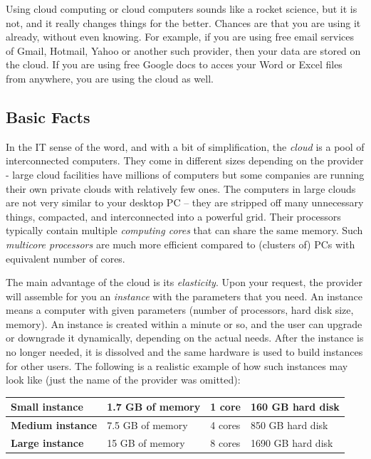 \documentclass{article}
\begin{document}
Using cloud computing or cloud computers sounds like a rocket science, but it is not,
and it really changes things for the better. Chances are that you are using 
it already, without even knowing. For example, if you are using free email services of Gmail, 
Hotmail, Yahoo or another such provider, then your data are stored on the cloud. If you are 
using free Google docs to acces your Word or Excel files from anywhere, you are using the cloud
as well. 

\subsection{Basic Facts}

In the IT sense of the word, and with a bit of simplification, the {\em cloud} 
is a pool of interconnected computers. They come in different sizes depending on the provider - 
large cloud facilities have millions of computers but some companies are running 
their own private clouds with relatively few ones. The computers in large clouds
are not very similar to your desktop PC -- they are stripped off many unnecessary 
things, compacted, and interconnected into a powerful grid. Their processors 
typically contain multiple {\em computing cores} that can share the same memory.
Such {\em multicore processors} are much more efficient compared to (clusters 
of) PCs with equivalent number of cores.

The main advantage of the cloud is its {\em elasticity}. Upon your request, the
provider will assemble for you an {\em instance} with the parameters that 
you need. An instance means a computer with given parameters (number of processors, 
hard disk size, memory). An instance is created within a minute or so, and the user can upgrade 
or downgrade it dynamically, depending on the actual needs. After the instance is 
no longer needed, it is dissolved and the same hardware is used to build instances 
for other users. The following is a realistic example of how such instances may 
look like (just the name of the provider was omitted):\\

\begin{center}
\begin{tabular}{|l|l|l|l|}
\hline
{\bf Small instance} & 1.7 GB of memory & 1 core & 160 GB hard disk \\
\hline
{\bf Medium instance} & 7.5 GB of memory & 4 cores & 850 GB hard disk \\
\hline
{\bf Large instance} & 15 GB of memory & 8 cores & 1690 GB hard disk \\
\hline
\end{tabular}
\end{center}
\end{document}
